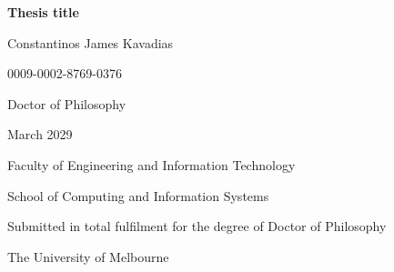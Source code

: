 \begin{titlepage}
    \centering
    \vspace*{2cm}

    {\Huge \textbf{Thesis title}}

    \vspace{2cm}

    {\Large Constantinos James Kavadias}

    \vspace{0.3cm}
    0009-0002-8769-0376

    \vspace{2cm}

    {\large Doctor of Philosophy}

    \vspace{1.5cm}

    {\large March 2029}

    \vspace{2cm}

    {\large Faculty of Engineering and Information Technology}

    \vspace{0.3cm}
    {\large School of Computing and Information Systems}

    \vfill

    Submitted in total fulfilment for the degree of Doctor of Philosophy

    \vspace{1.5cm}

    The University of Melbourne

    \vspace*{1cm}
\end{titlepage}
